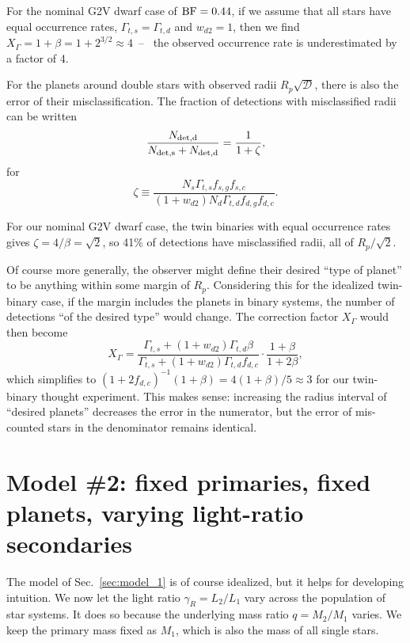 \documentclass{emulateapj}
\begin{document}
For the nominal G2V dwarf case of ${\rm BF}=0.44$, if we assume that all stars 
have equal occurrence rates, $\Gamma_{t,s} = \Gamma_{t,d}$ and 
$w_{d2}=1$, then we find $X_\Gamma = 1+\beta = 1+ 2^{3/2}\approx4$~--~ the 
observed occurrence rate is underestimated by a factor of 4.


For the planets around double stars with observed radii $R_p 
\sqrt{\mathcal{D}}$, there is also the error of their misclassification.
The fraction of detections with misclassified radii can be written
\begin{equation}
\frac{N_{\rm det,d}}{N_{\rm det,s} + N_{\rm det,d}} = \frac{1}{1+\zeta},
\end{equation}
for
\begin{equation}
\zeta \equiv \frac{N_s \Gamma_{t,s} f_{s,g} f_{s,c}}{
	 (1+w_{d2})N_d \Gamma_{t,d} f_{d,g} f_{d,c }}.
\end{equation}

For our nominal G2V dwarf case, the twin binaries with equal 
occurrence rates gives $\zeta = 4/\beta = \sqrt{2}$, so 41\% of detections 
have misclassified radii, all of $R_p/\sqrt{2}$.

Of course more generally, the observer might define their 
desired ``type of planet'' to be anything within some margin of $R_p$.
Considering this for the idealized twin-binary case, if the margin includes 
the planets in binary systems, the number of detections ``of the desired 
type'' would change.
The correction factor $X_\Gamma$ would then become
\begin{equation}
X_\Gamma = 
\frac{\Gamma_{t,s} + (1+w_{d2})\Gamma_{t,d}\beta}{\Gamma_{t,s} + 
(1+w_{d2})\Gamma_{t,d} f_{d,c} } \cdot 
\frac{1+\beta}{1+2\beta},
\end{equation}
which simplifies to $(1+2f_{d,c})^{-1} (1+\beta) = 4(1+\beta)/5\approx 3$ for 
our twin-binary thought experiment.
This makes sense: increasing the radius interval of ``desired planets'' 
decreases the error in the numerator, but the error of mis-counted stars in 
the denominator remains identical.


\section{Model \#2: fixed primaries, fixed planets, varying light-ratio 
secondaries}
\label{sec:model_2}

The model of Sec.~\ref{sec:model_1} is of course idealized, but it helps
for developing intuition.
We now let the light ratio $\gamma_R = L_2/L_1$ vary across the population 
of star systems.
It does so because the underlying mass ratio $q=M_2/M_1$ varies.
We keep the primary mass fixed as $M_1$, which is also the mass of all single 
stars.
\end{document}
